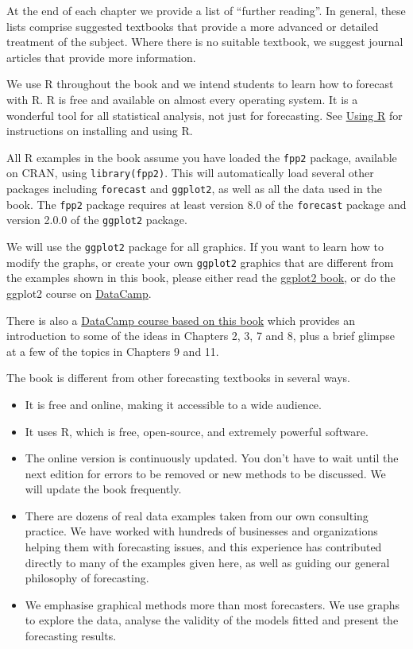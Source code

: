 \documentclass[]{book}
\providecommand{\tightlist}{%
  \setlength{\itemsep}{0pt}\setlength{\parskip}{0pt}}
\begin{document}
At the end of each chapter we provide a list of ``further reading''. In general, these lists comprise suggested textbooks that provide a more advanced or detailed treatment of the subject. Where there is no suitable textbook, we suggest journal articles that provide more information.

We use R throughout the book and we intend students to learn how to forecast with R. R is free and available on almost every operating system. It is a wonderful tool for all statistical analysis, not just for forecasting. See \href{http://OTexts.org/fpp2/using-r.html}{Using R} for instructions on installing and using R.

All R examples in the book assume you have loaded the \texttt{fpp2} package, available on CRAN, using \texttt{library(fpp2)}. This will automatically load several other packages including \texttt{forecast} and \texttt{ggplot2}, as well as all the data used in the book. The \texttt{fpp2} package requires at least version 8.0 of the \texttt{forecast} package and version 2.0.0 of the \texttt{ggplot2} package.

We will use the \texttt{ggplot2} package for all graphics. If you want to learn how to modify the graphs, or create your own \texttt{ggplot2} graphics that are different from the examples shown in this book, please either read the \href{https://www.amazon.com/dp/0387981403?tag=otexts-20}{ggplot2 book}, or do the ggplot2 course on \href{https://www.datacamp.com/courses/data-visualization-with-ggplot2-1}{DataCamp}.

There is also a \href{https://www.datacamp.com/courses/forecasting-using-r}{DataCamp course based on this book} which provides an introduction to some of the ideas in Chapters 2, 3, 7 and 8, plus a brief glimpse at a few of the topics in Chapters 9 and 11.

The book is different from other forecasting textbooks in several ways.

\begin{itemize}
\tightlist
\item
  It is free and online, making it accessible to a wide audience.
\item
  It uses R, which is free, open-source, and extremely powerful software.
\item
  The online version is continuously updated. You don't have to wait until the next edition for errors to be removed or new methods to be discussed. We will update the book frequently.
\item
  There are dozens of real data examples taken from our own consulting practice. We have worked with hundreds of businesses and organizations helping them with forecasting issues, and this experience has contributed directly to many of the examples given here, as well as guiding our general philosophy of forecasting.
\item
  We emphasise graphical methods more than most forecasters. We use graphs to explore the data, analyse the validity of the models fitted and present the forecasting results.
\end{itemize}
\end{document}
